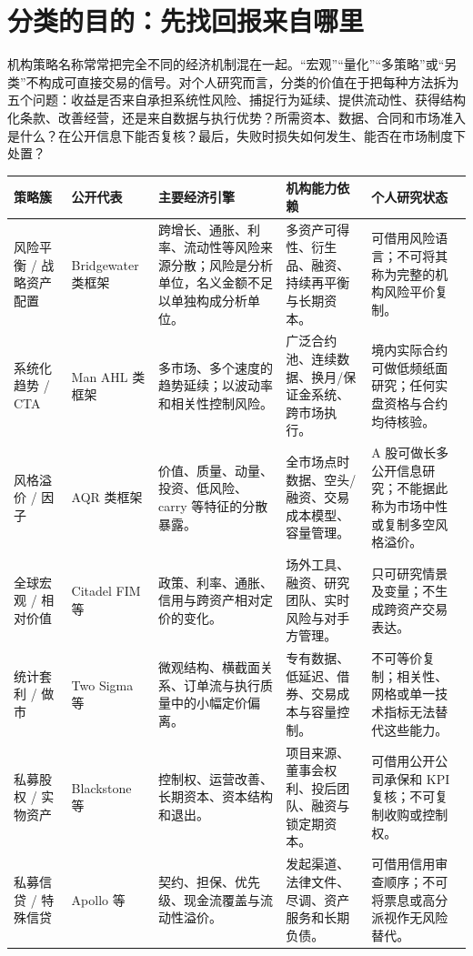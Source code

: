\section{分类的目的：先找回报来自哪里}

机构策略名称常常把完全不同的经济机制混在一起。“宏观”“量化”“多策略”或“另类”不构成可直接交易的信号。对个人研究而言，分类的价值在于把每种方法拆为五个问题：收益是否来自承担系统性风险、捕捉行为延续、提供流动性、获得结构化条款、改善经营，还是来自数据与执行优势？所需资本、数据、合同和市场准入是什么？在公开信息下能否复核？最后，失败时损失如何发生、能否在市场制度下处置？

\begin{exhibitbox}
\scriptsize
\begin{tabularx}{\exhibitboxwidth}{L{2.35cm} L{2.1cm} X L{2.65cm} L{2.6cm}}
\toprule
\textbf{策略簇} & \textbf{公开代表} & \textbf{主要经济引擎} & \textbf{机构能力依赖} & \textbf{个人研究状态} \\
\midrule
风险平衡 / 战略资产配置 & Bridgewater 类框架 & 跨增长、通胀、利率、流动性等风险来源分散；风险是分析单位，名义金额不足以单独构成分析单位。 & 多资产可得性、衍生品、融资、持续再平衡与长期资本。 & 可借用风险语言；不可将其称为完整的机构风险平价复制。 \\
系统化趋势 / CTA & Man AHL 类框架 & 多市场、多个速度的趋势延续；以波动率和相关性控制风险。 & 广泛合约池、连续数据、换月/保证金系统、跨市场执行。 & 境内实际合约可做低频纸面研究；任何实盘资格与合约均待核验。 \\
风格溢价 / 因子 & AQR 类框架 & 价值、质量、动量、投资、低风险、carry 等特征的分散暴露。 & 全市场点时数据、空头/融资、交易成本模型、容量管理。 & A 股可做长多公开信息研究；不能据此称为市场中性或复制多空风格溢价。 \\
全球宏观 / 相对价值 & Citadel FIM 等 & 政策、利率、通胀、信用与跨资产相对定价的变化。 & 场外工具、融资、研究团队、实时风险与对手方管理。 & 只可研究情景及变量；不生成跨资产交易表达。 \\
统计套利 / 做市 & Two Sigma 等 & 微观结构、横截面关系、订单流与执行质量中的小幅定价偏离。 & 专有数据、低延迟、借券、交易成本与容量控制。 & 不可等价复制；相关性、网格或单一技术指标无法替代这些能力。 \\
私募股权 / 实物资产 & Blackstone 等 & 控制权、运营改善、长期资本、资本结构和退出。 & 项目来源、董事会权利、投后团队、融资与锁定期资本。 & 可借用公开公司承保和 KPI 复核；不可复制收购或控制权。 \\
私募信贷 / 特殊信贷 & Apollo 等 & 契约、担保、优先级、现金流覆盖与流动性溢价。 & 发起渠道、法律文件、尽调、资产服务和长期负债。 & 可借用信用审查顺序；不可将票息或高分派视作无风险替代。 \\
\bottomrule
\end{tabularx}
\end{exhibitbox}

